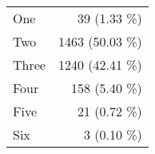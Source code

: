 \begin{tabular}{ l  r }
One & 39 (1.33 \%)\\
Two & 1463 (50.03 \%)\\
Three & 1240 (42.41 \%)\\
Four & 158 (5.40 \%)\\
Five & 21 (0.72 \%)\\
Six & 3 (0.10 \%)\\
\end{tabular}